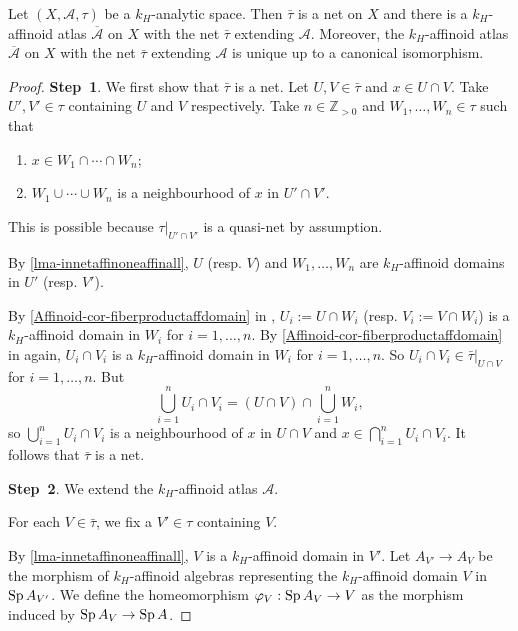 \begin{lemma}
    Let $(X,\mathcal{A},\tau)$ be a $k_H$-analytic space. Then $\bar{\tau}$ is a net on $X$ and there is a $k_H$-affinoid atlas $\overline{\mathcal{A}}$ on $X$ with the net $\bar{\tau}$  extending $\mathcal{A}$. Moreover, the $k_H$-affinoid atlas $\overline{\mathcal{A}}$ on $X$ with the net $\bar{\tau}$  extending $\mathcal{A}$ is unique up to a canonical isomorphism.
\end{lemma}
\begin{proof}
    \textbf{Step~1}.
    We first show that $\bar{\tau}$ is a net. Let $U,V\in \bar{\tau}$ and $x\in U\cap V$. Take $U',V'\in \tau$ containing $U$ and $V$ respectively. Take $n\in \mathbb{Z}_{>0}$ and $W_1,\ldots,W_n\in \tau$ such that 
    \begin{enumerate}
        \item $x\in W_1\cap \cdots \cap W_n$;
        \item $W_1\cup\cdots\cup W_n$ is a neighbourhood of $x$ in $U'\cap V'$.
    \end{enumerate}
    This is possible because $\tau|_{U'\cap V'}$ is a quasi-net by assumption.

    By \cref{lma-innetaffinoneaffinall}, $U$ (resp. $V$) and $W_1,\ldots,W_n$ are $k_H$-affinoid domains in $U'$ (resp. $V'$).

    By \cref{Affinoid-cor-fiberproductaffdomain} in , $U_i:=U\cap W_i$ (resp. $V_i:=V\cap W_i$) is a $k_H$-affinoid domain in $W_i$  for $i=1,\ldots,n$. By \cref{Affinoid-cor-fiberproductaffdomain} in  again, $U_i\cap V_i$ is a $k_H$-affinoid domain in $W_i$ for $i=1,\ldots,n$. So $U_i\cap V_i\in \bar{\tau}|_{U\cap V}$ for $i=1,\ldots,n$. But
    \[
        \bigcup_{i=1}^n U_i\cap V_i=(U\cap V)\cap \bigcup_{i=1}^n W_i,  
    \]
    so $\bigcup_{i=1}^n U_i\cap V_i$ is a neighbourhood of $x$ in $U\cap V$ and $x\in \bigcap_{i=1}^n U_i\cap V_i$. It follows that $\bar{\tau}$ is a net.

    \textbf{Step~2}. We extend the $k_H$-affinoid atlas $\mathcal{A}$.

    For each $V\in \bar{\tau}$, we fix a $V'\in \tau$ containing $V$. 
    
    By \cref{lma-innetaffinoneaffinall}, $V$ is a $k_H$-affinoid domain in $V'$. Let $A_{V'}\rightarrow A_V$ be the morphism of $k_H$-affinoid algebras representing the $k_H$-affinoid domain $V$ in $\operatorname{Sp} A_{V'}$. We define the homeomorphism $\varphi_V:\operatorname{Sp} A_V\rightarrow V$ as the morphism induced by $\operatorname{Sp} A_V\rightarrow \operatorname{Sp} A$.



\end{proof}
